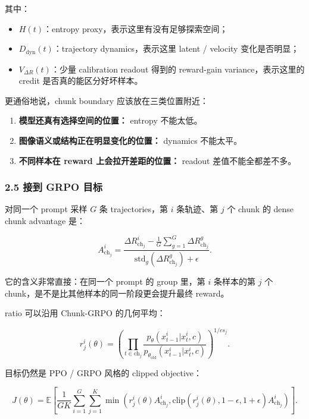 其中：

\begin{itemize}[leftmargin=1.5em]
  \item \(H(t)\)：entropy proxy，表示这里有没有足够探索空间；
  \item \(D_{\mathrm{dyn}}(t)\)：trajectory dynamics，表示这里 latent / velocity 变化是否明显；
  \item \(V_{\Delta R}(t)\)：少量 calibration readout 得到的 reward-gain variance，表示这里的 credit 是否真的能区分好坏样本。
\end{itemize}

更通俗地说，chunk boundary 应该放在三类位置附近：

\begin{enumerate}[leftmargin=1.5em]
  \item \textbf{模型还真有选择空间的位置：} entropy 不能太低。
  \item \textbf{图像语义或结构正在明显变化的位置：} dynamics 不能太平。
  \item \textbf{不同样本在 reward 上会拉开差距的位置：} readout 差值不能全都差不多。
\end{enumerate}

\subsubsection{2.5 接到 GRPO 目标}

对同一个 prompt 采样 \(G\) 条 trajectories，第 \(i\) 条轨迹、第 \(j\) 个 chunk 的 dense chunk advantage 是：

\[
A^i_{\mathrm{ch}_j}
=
\frac{
\Delta R^i_{\mathrm{ch}_j}
-
\frac{1}{G}\sum_{g=1}^{G}\Delta R^g_{\mathrm{ch}_j}
}{
\mathrm{std}_{g}(\Delta R^g_{\mathrm{ch}_j})+\epsilon
}.
\]

它的含义非常直接：在同一个 prompt 的 group 里，第 \(i\) 条样本的第 \(j\) 个 chunk，是不是比其他样本的同一阶段更会提升最终 reward。

ratio 可以沿用 Chunk-GRPO 的几何平均：

\[
r^i_j(\theta)
=
\left(
\prod_{t\in \mathrm{ch}_j}
\frac{p_{\theta}(x^i_{t-1}|x^i_t,c)}{p_{\theta_{\mathrm{old}}}(x^i_{t-1}|x^i_t,c)}
\right)^{1/cs_j}.
\]

目标仍然是 PPO / GRPO 风格的 clipped objective：

\[
J(\theta)
=
\mathbb{E}
\left[
\frac{1}{GK}
\sum_{i=1}^{G}
\sum_{j=1}^{K}
\min\left(
 r^i_j(\theta)A^i_{\mathrm{ch}_j},
 \mathrm{clip}(r^i_j(\theta),1-\epsilon,1+\epsilon)A^i_{\mathrm{ch}_j}
\right)
\right].
\]


